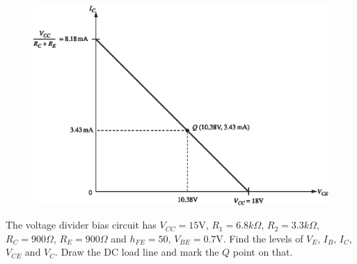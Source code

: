 \begin{solution}
\begin{figure}[H]
\includegraphics{chap3/S3-EE-03-IN027.eps}
\end{figure}
\vskip -1cm
\end{solution}

\medskip

\begin{example}\label{exam4.17}
The voltage divider bias circuit has $V_{CC}=15\text{V}$, $R_{1}=6.8 k\Omega$, $R_{2}=3.3 k\Omega$, $R_{C}=900\Omega$, $R_{E}=900\Omega$ and $h_{FE}=50$, $V_{BE}=0.7\text{V}$. Find the levels of $V_{E}$, $I_{B}$, $I_{C}$, $V_{CE}$ and $V_{C}$. Draw the DC load line and mark the $Q$ point on that.
\end{example}


